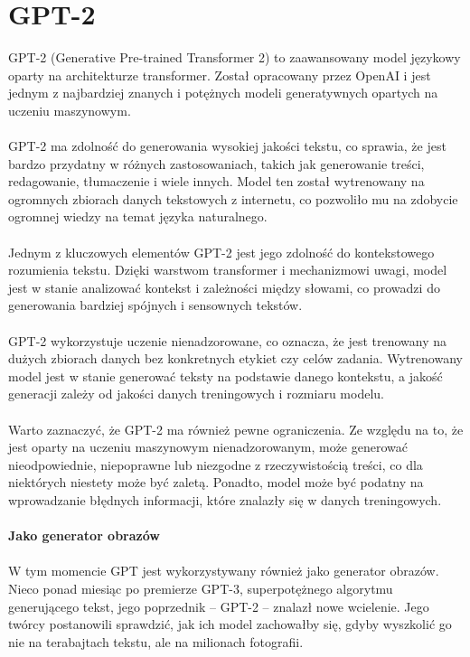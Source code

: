 \documentclass{article}
\begin{document}
\section{GPT-2}
GPT-2 (Generative Pre-trained Transformer 2) to zaawansowany model językowy oparty na architekturze transformer. Został opracowany przez OpenAI i jest jednym z najbardziej znanych i potężnych modeli generatywnych opartych na uczeniu maszynowym.\\\\
GPT-2 ma zdolność do generowania wysokiej jakości tekstu, co sprawia, że jest bardzo przydatny w różnych zastosowaniach, takich jak generowanie treści, redagowanie, tłumaczenie i wiele innych. Model ten został wytrenowany na ogromnych zbiorach danych tekstowych z internetu, co pozwoliło mu na zdobycie ogromnej wiedzy na temat języka naturalnego.\\\\
Jednym z kluczowych elementów GPT-2 jest jego zdolność do kontekstowego rozumienia tekstu. Dzięki warstwom transformer i mechanizmowi uwagi, model jest w stanie analizować kontekst i zależności między słowami, co prowadzi do generowania bardziej spójnych i sensownych tekstów.\\\\
GPT-2 wykorzystuje uczenie nienadzorowane, co oznacza, że jest trenowany na dużych zbiorach danych bez konkretnych etykiet czy celów zadania. Wytrenowany model jest w stanie generować teksty na podstawie danego kontekstu, a jakość generacji zależy od jakości danych treningowych i rozmiaru modelu.\\\\
Warto zaznaczyć, że GPT-2 ma również pewne ograniczenia. Ze względu na to, że jest oparty na uczeniu maszynowym nienadzorowanym, może generować nieodpowiednie, niepoprawne lub niezgodne z rzeczywistością treści, co dla niektórych niestety może być zaletą. Ponadto, model może być podatny na wprowadzanie błędnych informacji, które znalazły się w danych treningowych.\\\\
\textbf{Jako generator obrazów}\\\\
W tym momencie GPT jest wykorzystywany również jako generator obrazów. Nieco ponad miesiąc po premierze GPT-3, superpotężnego algorytmu generującego tekst, jego poprzednik – GPT-2 – znalazł nowe wcielenie. Jego twórcy postanowili sprawdzić, jak ich model zachowałby się, gdyby wyszkolić go nie na terabajtach tekstu, ale na milionach fotografii.\\\\
\end{document}
